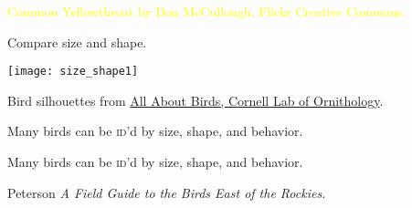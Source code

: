 \documentclass[t]{beamer}
\begin{document}
%
%
%
%
%
%
%
%


{
\begin{frame}[b,plain]
	\tiny\textcolor{yellow}{Common Yellowthroat by Don McCullough, Flickr Creative Commons.}
\end{frame}
}

\begin{frame}[b,plain]{Compare size and shape.}
	\begin{center}
		\texttt{[image: size\_shape1]}
	\end{center}
	\tiny Bird silhouettes from \href{http://allaboutbirds.com}{All About Birds, Cornell Lab of Ornithology}.
\end{frame}


{
\begin{frame}[t,plain]{Many birds can be \textsc{id}'d by size, shape, and behavior.}

	\vfilll
	
	\tiny\hfill{}
\end{frame}
}

{
\begin{frame}[t,plain]{Many birds can be \textsc{id}'d by size, shape, and behavior.}

	\vfilll
	
	\tiny\hfill{Peterson \textit{A Field Guide to the Birds East of the Rockies.}}
\end{frame}
}
\end{document}
